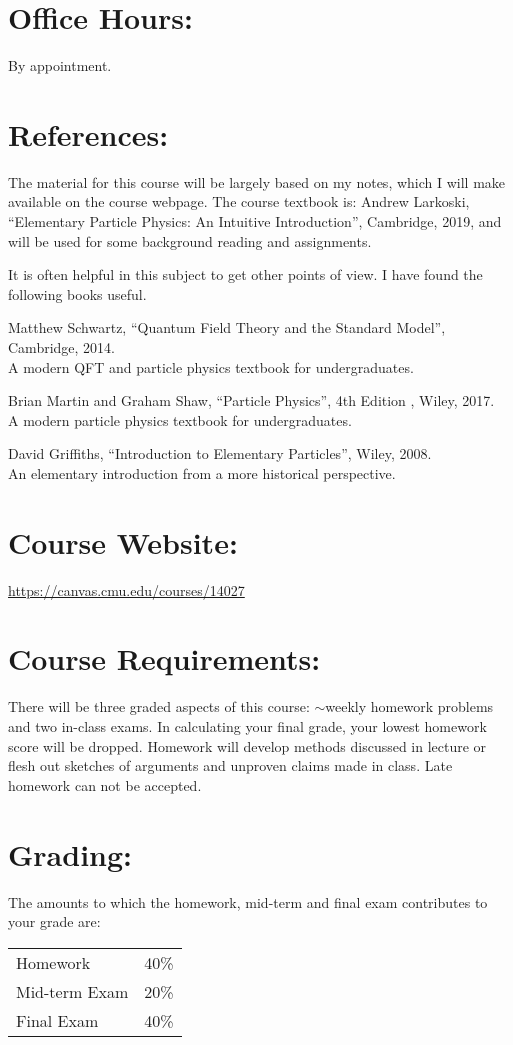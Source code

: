 \documentclass[margin,line]{res}
\begin{document}
\begin{resume}
\section{Office Hours:}
By appointment.



\section{References:}
The material for this course will be largely based on my  notes, which I will make available on the course webpage. 
The course textbook is:
Andrew Larkoski, ``Elementary Particle Physics: An Intuitive Introduction'', Cambridge, 2019,
and will be used for some background reading and assignments. 

It is often helpful in this subject to get other points of view.  
I have found the following books useful. 

Matthew Schwartz, ``Quantum Field Theory and the Standard Model'', Cambridge, 2014.\\
A modern QFT and particle physics textbook for undergraduates.

Brian Martin and Graham Shaw, ``Particle Physics'', 4th Edition , Wiley, 2017.\\
A modern particle physics textbook for undergraduates.

David Griffiths, ``Introduction to Elementary Particles'', Wiley, 2008.\\
An elementary introduction from a more historical perspective.

\section{Course Website:}  
\href{https://canvas.cmu.edu/courses/14027}{https://canvas.cmu.edu/courses/14027}

\newpage

\section{Course Requirements:}
There will be three graded aspects of this course: $\sim$weekly homework problems and two in-class exams.
In calculating your final grade, your lowest homework score will be dropped.
Homework will develop methods discussed in lecture or flesh out sketches of arguments and unproven claims made in class.
Late homework can not be accepted.

\section{Grading:} 
The amounts to which the homework, mid-term and final exam contributes to your grade are:
\begin{center}
\begin{tabular}{lc}
Homework & 40\%\\
Mid-term Exam & 20\%\\
Final Exam & 40\%\\
\end{tabular}
\end{center}


\end{resume}
\end{document}
